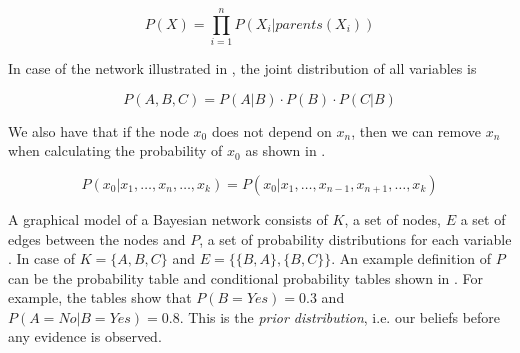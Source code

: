 \begin{equation}
\label{eq:analysis:bayesian-network:prod}
P(X) = \displaystyle \prod_{i=1}^{n} P(X_i|parents(X_i))
\end{equation}

In case of the network illustrated in , the joint distribution of all variables is

\begin{equation}
P(A, B, C) = P(A|B) \cdot P(B) \cdot P(C|B)
\end{equation}

We also have that if the node $x_0$ does not depend on $x_n$, then we can remove $x_n$ when calculating the probability of $x_0$ as shown in  \cite{stephenson2000introduction}.

\begin{equation}
\label{eq:analysis:bayesian-network:not-child}
P(x_0|x_1,\ldots,x_n,\ldots,x_k) = P(x_0|x_1,\ldots,x_{n-1},x_{n+1},\ldots,x_k)
\end{equation}

A graphical model of a Bayesian network consists of $K$, a set of nodes, $E$ a set of edges between the nodes and $P$, a set of probability distributions for each variable \cite{stephenson2000introduction}. In case of  $K = \{A, B, C\}$ and $E = \{\{B, A\}, \{B,C\}\}$. An example definition of $P$ can be the probability table and conditional probability tables shown in . For example, the tables show that $P(B=Yes) = 0.3$ and $P(A=No|B=Yes) = 0.8$. This is the \emph{prior distribution}, i.e. our beliefs before any evidence is observed.

